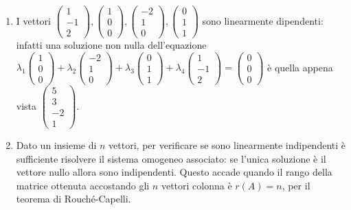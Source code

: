 \documentclass{article}
\begin{document}
\begin{enumerate}
\item I vettori $\left( 
\begin{array}{c}
1 \\ 
-1 \\ 
2%
\end{array}%
\right) ,\left( 
\begin{array}{c}
1 \\ 
0 \\ 
0%
\end{array}%
\right) ,\left( 
\begin{array}{c}
-2 \\ 
1 \\ 
0%
\end{array}%
\right) ,\left( 
\begin{array}{c}
0 \\ 
1 \\ 
1%
\end{array}%
\right) $ sono linearmente dipendenti: infatti una soluzione non nulla
dell'equazione $\lambda _{1}\left( 
\begin{array}{c}
1 \\ 
0 \\ 
0%
\end{array}%
\right) +\lambda _{2}\left( 
\begin{array}{c}
-2 \\ 
1 \\ 
0%
\end{array}%
\right) +\lambda _{3}\left( 
\begin{array}{c}
0 \\ 
1 \\ 
1%
\end{array}%
\right) +\lambda _{4}\left( 
\begin{array}{c}
1 \\ 
-1 \\ 
2%
\end{array}%
\right) =\left( 
\begin{array}{c}
0 \\ 
0 \\ 
0%
\end{array}%
\right) $ \`{e} quella appena vista $\left( 
\begin{array}{c}
5 \\ 
3 \\ 
-2 \\ 
1%
\end{array}%
\right) $.

\item Dato un insieme di $n$ vettori, per verificare se sono linearmente
indipendenti \`{e} sufficiente risolvere il sistema omogeneo associato: se
l'unica soluzione \`{e} il vettore nullo allora sono indipendenti. Questo
accade quando il rango della matrice ottenuta accostando gli $n$ vettori
colonna \`{e} $r\left( A\right) =n$, per il teorema di Rouch\'{e}-Capelli.


\end{enumerate}
\end{document}

